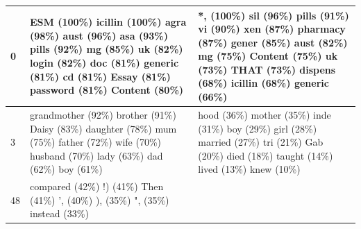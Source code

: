 \documentclass{article}
\begin{document}
\begin{table}[htbp]
\begin{tabular}{p{1.4cm} p{6cm} p{6cm}}
0 & \colorbox{lightOlmoeLightBlue}{ESM} (100\%) \colorbox{lightOlmoeLightBlue}{icillin} (100\%) \colorbox{lightOlmoeLightBlue}{agra} (98\%) \colorbox{lightOlmoeLightBlue}{ aust} (96\%) \colorbox{lightOlmoeLightBlue}{asa} (93\%) \colorbox{lightOlmoeLightBlue}{ pills} (92\%) \colorbox{lightOlmoeLightBlue}{ mg} (85\%) \colorbox{lightOlmoeLightBlue}{ uk} (82\%) \colorbox{lightOlmoeLightBlue}{ login} (82\%) \colorbox{lightOlmoeLightBlue}{doc} (81\%) \colorbox{lightOlmoeLightBlue}{ generic} (81\%) \colorbox{lightOlmoeLightBlue}{cd} (81\%) \colorbox{lightOlmoeLightBlue}{ Essay} (81\%) \colorbox{lightOlmoeLightBlue}{ password} (81\%) \colorbox{lightOlmoeLightBlue}{ Content} (80\%) &  \colorbox{lightOlmoeLightBlue}{*,} (100\%) \colorbox{lightOlmoeLightBlue}{ sil} (96\%) \colorbox{lightOlmoeLightBlue}{ pills} (91\%) \colorbox{lightOlmoeLightBlue}{ vi} (90\%) \colorbox{lightOlmoeLightBlue}{ xen} (87\%) \colorbox{lightOlmoeLightBlue}{ pharmacy} (87\%) \colorbox{lightOlmoeLightBlue}{ gener} (85\%) \colorbox{lightOlmoeLightBlue}{ aust} (82\%) \colorbox{lightOlmoeLightBlue}{ mg} (75\%) \colorbox{lightOlmoeLightBlue}{ Content} (75\%) \colorbox{lightOlmoeLightBlue}{ uk} (73\%) \colorbox{lightOlmoeLightBlue}{ THAT} (73\%) \colorbox{lightOlmoeLightBlue}{ dispens} (68\%) \colorbox{lightOlmoeLightBlue}{icillin} (68\%) \colorbox{lightOlmoeLightBlue}{ generic} (66\%) \\
\midrule
3 & \colorbox{lightOlmoeLightBlue}{ grandmother} (92\%) \colorbox{lightOlmoeLightBlue}{ brother} (91\%) \colorbox{lightOlmoeLightBlue}{ Daisy} (83\%) \colorbox{lightOlmoeLightBlue}{ daughter} (78\%) \colorbox{lightOlmoeLightBlue}{ mum} (75\%) \colorbox{lightOlmoeLightBlue}{ father} (72\%) \colorbox{lightOlmoeLightBlue}{ wife} (70\%) \colorbox{lightOlmoeLightBlue}{ husband} (70\%) \colorbox{lightOlmoeLightBlue}{ lady} (63\%) \colorbox{lightOlmoeLightBlue}{ dad} (62\%) \colorbox{lightOlmoeLightBlue}{ boy} (61\%) &  \colorbox{lightOlmoeLightBlue}{hood} (36\%) \colorbox{lightOlmoeLightBlue}{mother} (35\%) \colorbox{lightOlmoeLightBlue}{inde} (31\%) \colorbox{lightOlmoeLightBlue}{ boy} (29\%) \colorbox{lightOlmoeLightBlue}{ girl} (28\%) \colorbox{lightOlmoeLightBlue}{ married} (27\%) \colorbox{lightOlmoeLightBlue}{ tri} (21\%) \colorbox{lightOlmoeLightBlue}{ Gab} (20\%) \colorbox{lightOlmoeLightBlue}{ died} (18\%) \colorbox{lightOlmoeLightBlue}{ taught} (14\%) \colorbox{lightOlmoeLightBlue}{ lived} (13\%) \colorbox{lightOlmoeLightBlue}{ knew} (10\%) \\
\midrule
48 & \colorbox{lightOlmoeLightBlue}{ compared} (42\%) \colorbox{lightOlmoeLightBlue}{!)} (41\%) \colorbox{lightOlmoeLightBlue}{Then} (41\%) \colorbox{lightOlmoeLightBlue}{’,} (40\%) \colorbox{lightOlmoeLightBlue}{),} (35\%) \colorbox{lightOlmoeLightBlue}{",} (35\%) \colorbox{lightOlmoeLightBlue}{ instead} (33\%) &

\end{tabular}
\end{table}
\end{document}
